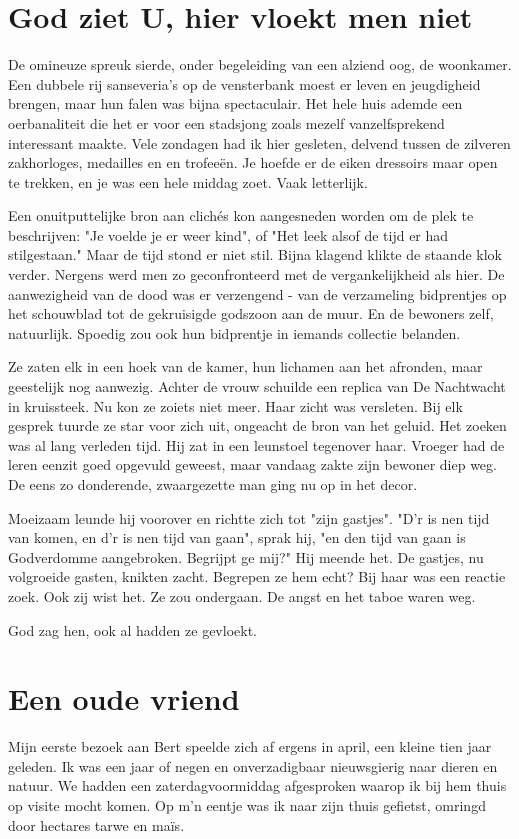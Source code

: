 \documentclass[12pt, justified, a4paper, symmetric]{tufte-book}
\begin{document}
\section{God ziet U, hier vloekt men niet}
De omineuze spreuk sierde, onder begeleiding van een alziend oog, de woonkamer. Een dubbele rij sanseveria's op de vensterbank moest er leven en jeugdigheid brengen, maar hun falen was bijna spectaculair. Het hele huis ademde een oerbanaliteit die het er voor een stadsjong zoals mezelf vanzelfsprekend interessant maakte. Vele zondagen had ik hier gesleten, delvend tussen de zilveren zakhorloges, medailles en en trofee\"en. Je hoefde er de eiken dressoirs maar open te trekken, en je was een hele middag zoet. Vaak letterlijk.

Een onuitputtelijke bron aan clich\'es kon aangesneden worden om de plek te beschrijven: "Je voelde je er weer kind", of "Het leek alsof de tijd er had stilgestaan." Maar de tijd stond er niet stil. Bijna klagend klikte de staande klok verder. Nergens werd men zo geconfronteerd met de vergankelijkheid als hier. De aanwezigheid van de dood was er verzengend - van de verzameling bidprentjes op het schouwblad tot de gekruisigde godszoon aan de muur. En de bewoners zelf, natuurlijk. Spoedig zou ook hun bidprentje in iemands collectie belanden.

Ze zaten elk in een hoek van de kamer, hun lichamen aan het afronden, maar geestelijk nog aanwezig. Achter de vrouw schuilde een replica van De Nachtwacht in kruissteek. Nu kon ze zoiets niet meer. Haar zicht was versleten. Bij elk gesprek tuurde ze star voor zich uit, ongeacht de bron van het geluid. Het zoeken was al lang verleden tijd. Hij zat in een leunstoel tegenover haar. Vroeger had de leren eenzit goed opgevuld geweest, maar vandaag zakte zijn bewoner diep weg. De eens zo donderende, zwaargezette man ging nu op in het decor.

Moeizaam leunde hij voorover en richtte zich tot "zijn gastjes". "D'r is nen tijd van komen, en d'r is nen tijd van gaan", sprak hij, "en den tijd van gaan is Godverdomme aangebroken. Begrijpt ge mij?" Hij meende het. De gastjes, nu volgroeide gasten, knikten zacht. Begrepen ze hem echt? Bij haar was een reactie zoek. Ook zij wist het. Ze zou ondergaan. De angst en het taboe waren weg.

God zag hen, ook al hadden ze gevloekt.

\newpage
\section{Een oude vriend}
Mijn eerste bezoek aan Bert speelde zich af ergens in april, een kleine tien jaar geleden. Ik was een jaar of negen en onverzadigbaar nieuwsgierig naar dieren en natuur. We hadden een zaterdagvoormiddag afgesproken waarop ik bij hem thuis op visite mocht komen. Op m'n eentje was ik naar zijn thuis gefietst, omringd door hectares tarwe en ma\"is.
\end{document}
